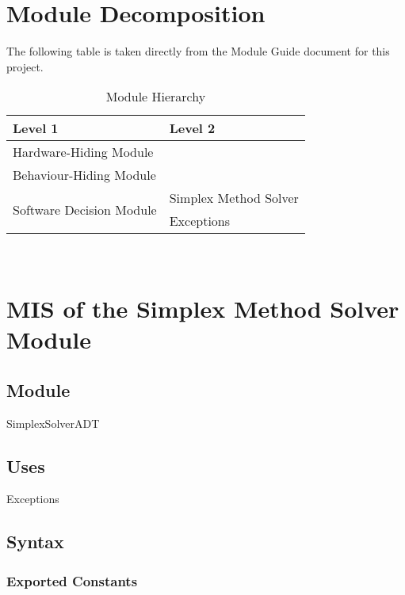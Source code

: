 \documentclass[12pt, titlepage]{article}
\begin{document}
\section{Module Decomposition}

The following table is taken directly from the Module Guide document for this project.

\begin{table}[h!]
	\centering
	\begin{tabular}{p{} p{}}
		\toprule
		\textbf{Level 1} & \textbf{Level 2}\\
		\midrule
		
		{Hardware-Hiding Module} & ~ \\
		\midrule
		
		{Behaviour-Hiding Module} & ~ \\
		\midrule
		
		\multirow{3}{0.3\textwidth}{Software Decision Module}
		& Simplex Method Solver\\
		& Exceptions\\
		\bottomrule
	\end{tabular}
	\caption{Module Hierarchy}
	\label{TblMH}
\end{table}

\newpage
~\newpage

\section{MIS of the Simplex Method Solver Module} \label{M_SimplexSolver} 

\subsection{Module}

SimplexSolverADT

\subsection{Uses}

Exceptions

\subsection{Syntax}

\subsubsection{Exported Constants}
\end{document}
